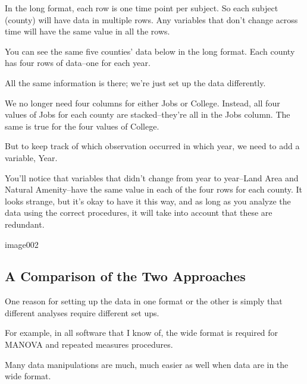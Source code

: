 In the long format, each row is one time point per subject. So each subject (county) will have data in multiple rows. Any variables that don’t change across time will have the same value in all the rows.

You can see the same five counties’ data below in the long format. Each county has four rows of data–one for each year.

All the same information is there; we’re just set up the data differently.

We no longer need four columns for either Jobs or College. Instead, all four values of Jobs for each county are stacked–they’re all in the Jobs column. The same is true for the four values of College.

But to keep track of which observation occurred in which year, we need to add a variable, Year.

You’ll notice that variables that didn’t change from year to year–Land Area and Natural Amenity–have the same value in each of the four rows for each county. It looks strange, but it’s okay to have it this way, and as long as you analyze the data using the correct procedures, it will take into account that these are redundant.

image002
\subsection{A Comparison of the Two Approaches}

One reason for setting up the data in one format or the other is simply that different analyses require different set ups.

For example, in all software that I know of, the wide format is required for MANOVA and repeated measures procedures.

Many data manipulations are much, much easier as well when data are in the wide format.
